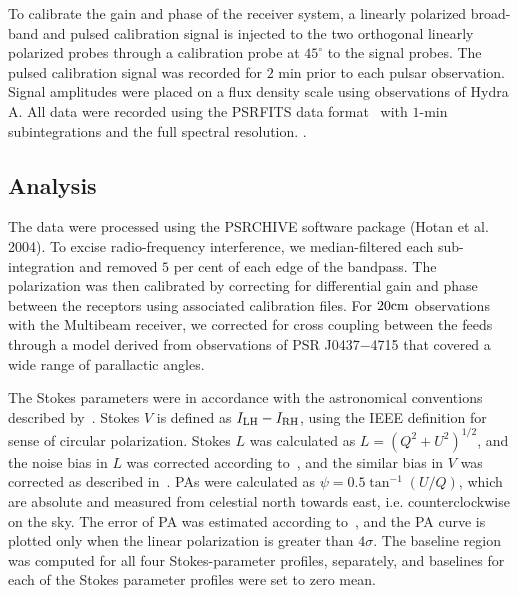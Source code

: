 \documentclass[useAMS,usenatbib]{mn2e}
\begin{document}
To calibrate the gain and phase of the receiver system, a linearly polarized 
broad-band and pulsed calibration signal is injected to the two orthogonal 
linearly polarized probes through a calibration probe at $45^{\circ}$ to the 
signal probes. The pulsed calibration signal was recorded for $2$ min prior to 
each pulsar observation.
%
Signal amplitudes were placed on a flux density scale using observations of 
Hydra A.
%
All data were recorded using the PSRFITS data format~\citep{Hotan04} with 
$1$-min subintegrations and the full spectral resolution.
%
\citep[for futher details see][and references therein]{Manchester13}. 
%

%


\subsection{Analysis}

The data were processed using the PSRCHIVE software package (Hotan et al. 2004). 
To excise radio-frequency interference, we median-filtered each sub-integration 
and removed $5$ per cent of each edge of the bandpass.
%
The polarization was then calibrated by correcting for differential gain and 
phase between the receptors using associated calibration files.
%
For $20\rm{cm}$ observations with the Multibeam receiver, we corrected for 
cross coupling between the feeds through a model derived from observations of 
PSR J0437$-$4715 that covered a wide range of parallactic angles.
%

The Stokes parameters were in accordance with the astronomical conventions described 
by~\citet{vanStraten10}. Stokes $V$ is defined as $I_{\rm{LH}}-I_{\rm{RH}}$, 
using the IEEE definition for sense of circular polarization. 
%
Stokes $L$ was calculated as $L=(Q^2+U^2)^{1/2}$, and the noise bias in $L$ 
was corrected according to~\citet{Lorimer05}, and the similar bias in 
$V$ was corrected as described in~\citet{Yan11}.
%
PAs were calculated as $\psi=0.5\tan^{-1}(U/Q)$, which are absolute 
and measured from celestial north towards east, i.e. counterclockwise on the sky.
%
The error of PA was estimated according to~\citet{Everett01}, and 
the PA curve is plotted only when the linear polarization is greater than 
$4\sigma$.
%
The baseline region was computed for all four Stokes-parameter profiles, separately, 
and baselines for each of the Stokes parameter profiles were set to zero mean.
%
\end{document}
